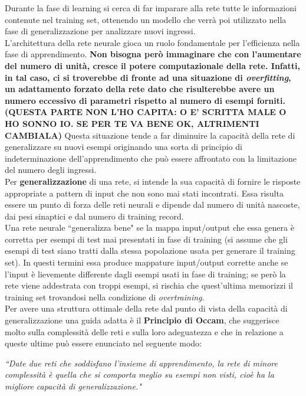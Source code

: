 \documentclass[12pt,a4paper,oneside]{book}
\begin{document}
		Durante la fase di learning si cerca di far imparare alla rete tutte le informazioni contenute nel training set, ottenendo un modello che verrà poi utilizzato nella fase di generalizzazione per analizzare nuovi ingressi.\\  
		L’architettura della rete neurale gioca un ruolo fondamentale per l’efficienza nella fase di apprendimento. \textbf{Non bisogna però immaginare che con l'aumentare del numero di unità, cresce il potere computazionale della rete. Infatti, in tal caso, ci si troverebbe di fronte ad una situazione di \emph{overfitting}, un adattamento forzato della rete dato che risulterebbe avere un numero eccessivo di parametri rispetto al numero di esempi forniti. (QUESTA PARTE NON L'HO CAPITA: O E' SCRITTA MALE O HO SONNO IO. SE PER TE VA BENE OK, ALTRIMENTI CAMBIALA)} Questa situazione tende a far diminuire la capacità della rete di generalizzare su nuovi esempi originando una sorta di principio di indeterminazione dell'apprendimento che può essere affrontato con la limitazione del numero degli ingressi.\\ 
		Per \textbf{generalizzazione} di una rete, si intende la sua capacità di fornire le risposte appropriate a pattern di input che non sono mai stati incontrati. Essa risulta essere un punto di forza delle reti neurali e dipende dal numero di unità nascoste, dai pesi sinaptici e dal numero di training record.\\
		Una rete neurale ``generalizza bene" se la mappa input/output che essa genera è corretta per esempi di test mai presentati in fase di training (si assume che gli esempi di test siano tratti dalla stessa popolazione usata per generare il training set). In questi termini essa produce mappature input/output corrette anche se l’input è lievemente differente dagli esempi usati in fase di training; se però la rete viene addestrata con troppi esempi, si rischia che quest'ultima memorizzi il training set trovandosi nella condizione di \emph{overtraining}. \\ 
		Per avere una struttura ottimale della rete dal punto di vista della capacità di generalizzazione una guida adatta è il \textbf{Principio di Occam}, che suggerisce molto sulla complessità delle reti e sulla loro adeguatezza e che in relazione a queste ultime può essere enunciato nel seguente modo:
		
		\textit{``Date due reti che soddisfano l'insieme di apprendimento, la rete di minore complessità è quella che si comporta meglio su esempi non visti, cioè ha la migliore capacità di generalizzazione."}\\ 
		
\end{document}
